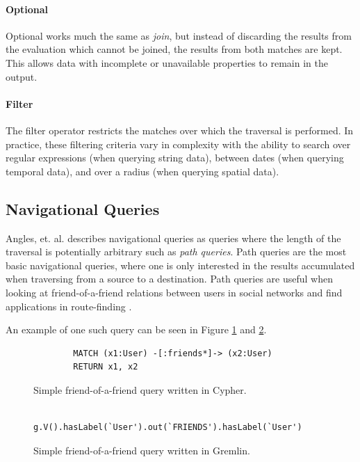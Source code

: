 \paragraph{Optional} Optional works much the same as \emph{join}, but instead of discarding the results from the evaluation which cannot be joined, the results from both matches are kept. This allows data with incomplete or unavailable properties to remain in the output.

\paragraph{Filter} The filter operator restricts the matches over which the traversal is performed. In practice, these filtering criteria vary in complexity with the ability to search over regular expressions (when querying string data), between dates (when querying temporal data), and over a radius (when querying spatial data).

\subsection{Navigational Queries}

Angles, et. al. \cite{foundations-of-modern-gql} describes navigational queries as queries where the length of the traversal is potentially arbitrary such as \emph{path queries}. Path queries are the most basic navigational queries, where one is only interested in the results accumulated when traversing from a source to a destination. Path queries are useful when looking at friend-of-a-friend relations between users in social networks and find applications in route-finding \cite{route-finding}.

An example of one such query can be seen in Figure \ref{lst:cypher-nav-1} and \ref{lst:gremlin-nav-1}.

\begin{figure}[h]
    \centering
    \begin{verbatim}
        MATCH (x1:User) -[:friends*]-> (x2:User)
        RETURN x1, x2
    \end{verbatim}
    \caption{Simple friend-of-a-friend query written in Cypher.}
    \label{lst:cypher-nav-1}
\end{figure}

\begin{figure}[h]
    \centering
    \begin{verbatim}
        g.V().hasLabel(`User').out(`FRIENDS').hasLabel(`User')
    \end{verbatim}
    \caption{Simple friend-of-a-friend query written in Gremlin.}
    \label{lst:gremlin-nav-1}
\end{figure}

